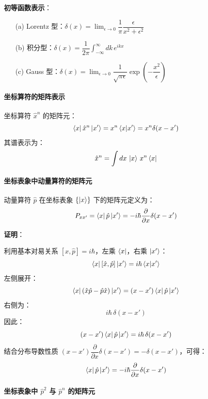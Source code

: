 \documentclass[12pt,a4paper]{article}
\begin{document}
\textbf{初等函数表示}：

\begin{enumerate}
    \item[(a)] Lorentz 型：$\delta(x)=\lim_{\epsilon\to 0}\dfrac{1}{\pi}\dfrac{\epsilon}{x^2+\epsilon^2}$
    \item[(b)] 积分型：$\delta(x)=\dfrac{1}{2\pi}\int_{-\infty}^{\infty}dk\,e^{ikx}$
    \item[(c)] Gauss 型：$\delta(x)=\lim_{\epsilon\to 0}\dfrac{1}{\sqrt{\pi\epsilon}}\exp\!\left(-\dfrac{x^2}{\epsilon}\right)$
\end{enumerate}

\paragraph{坐标算符的矩阵表示}

坐标算符 $\hat{x}^n$ 的矩阵元：
\[
\bra{x}\hat{x}^n\ket{x'}=x^n\braket{x|x'}=x^n\delta(x-x')
\]
其谱表示为：
\[
\hat{x}^n=\int dx\,\ket{x}\,x^n\bra{x}
\]

\paragraph{坐标表象中动量算符的矩阵元}

动量算符 $\hat{p}$ 在坐标表象 $\{\ket{x}\}$ 下的矩阵元定义为：
\[
P_{xx'}=\bra{x}\hat{p}\ket{x'}=-i\hbar\frac{\partial}{\partial x}\delta(x-x')
\]

\textbf{证明}：

利用基本对易关系 $[\hat{x},\hat{p}]=i\hbar$，左乘 $\bra{x}$，右乘 $\ket{x'}$：
\[
\bra{x}[\hat{x},\hat{p}]\ket{x'}=i\hbar\braket{x|x'}
\]
左侧展开：
\[
\bra{x}(\hat{x}\hat{p}-\hat{p}\hat{x})\ket{x'}=(x-x')\bra{x}\hat{p}\ket{x'}
\]
右侧为：
\[
i\hbar\,\delta(x-x')
\]
因此：
\[
(x-x')\bra{x}\hat{p}\ket{x'}=i\hbar\,\delta(x-x')
\]
结合分布导数性质 $(x-x')\dfrac{\partial}{\partial x}\delta(x-x')=-\delta(x-x')$，可得：
\[
\bra{x}\hat{p}\ket{x'}=-i\hbar\frac{\partial}{\partial x}\delta(x-x')
\]

\paragraph{\texorpdfstring{坐标表象中 $\hat{p}^2$ 与 $\hat{p}^n$ 的矩阵元}{坐标表象中 p^2 与 p^n 的矩阵元}}
\end{document}
